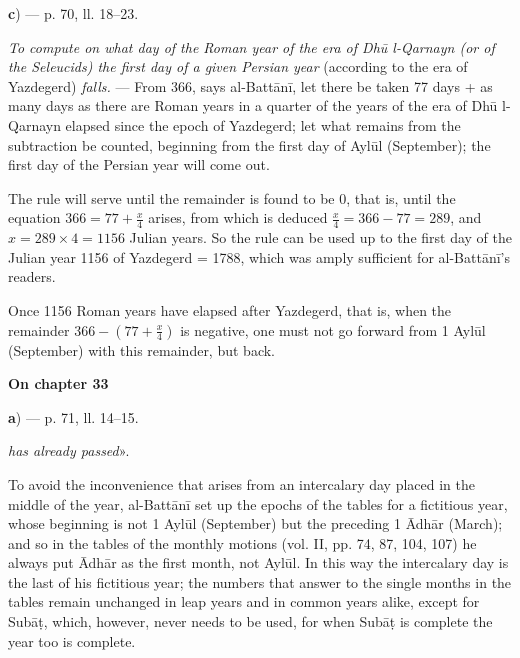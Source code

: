 \documentclass[11pt]{article}
\newcommand{\Pg}[1]{\marginpar{\footnotesize\color{gray}#1}}
\newcommand{\UnitHead}[2]{\par\setcounter{footnoteT}{0}\needspace{8\baselineskip}\bigskip\pdfbookmark[1]{#1}{unit-#2}\hypertarget{EN-#2}{}%
 {\large\bfseries\interlinepenalty=10000 #1\par}\nobreak\medskip}
\begin{document}
\par\begin{center}\textbf{c}) — p. 70, ll. 18–23.\end{center}
\par \emph{To compute on what day of the Roman year of the era of Dhū l-Qarnayn (or of the Seleucids) the first day of a given Persian year} (according to the era of Yazdegerd) \emph{falls.} — From 366, says al-Battānī, let there be taken 77 days + as many days as there are Roman years in a quarter of the years of the era of Dhū l-Qarnayn elapsed since the epoch of Yazdegerd; let what remains from the subtraction be counted, beginning from the first day of Aylūl (September); the first day of the Persian year will come out.\par
\par \Pg{I 246}The rule will serve until the remainder is found to be 0, that is, until the equation $366 = 77 + \frac{x}{4}$ arises, from which is deduced $\frac{x}{4} = 366 - 77 = 289$, and $x = 289 \times 4 = 1156$ Julian years. So the rule can be used up to the first day of the Julian year 1156 of Yazdegerd = 1788, which was amply sufficient for al-Battānī's readers.\par
\par Once 1156 Roman years have elapsed after Yazdegerd, that is, when the remainder $366 - \left(77 + \frac{x}{4}\right)$ is negative, one must not go forward from 1 Aylūl (September) with this remainder, but back.\par
\UnitHead{On chapter 33}{A33}
\par\begin{center}\textbf{a}) — p. 71, ll. 14–15.\end{center}
\par [«\emph{But do not count with them the year in which you are, unless the noon of the last day of Subāṭ} [February] \emph{has already passed}».\par
\par To avoid the inconvenience that arises from an intercalary day placed in the middle of the year, al-Battānī set up the epochs of the tables for a fictitious year, whose beginning is not 1 Aylūl (September) but the preceding 1 Ādhār (March); and so in the tables of the monthly motions (vol. II, pp. 74, 87, 104, 107) he always put Ādhār as the first month, not Aylūl. In this way the intercalary day is the last of his fictitious year; the numbers that answer to the single months in the tables remain unchanged in leap years and in common years alike, except for Subāṭ, which, however, never needs to be used, for when Subāṭ is complete the year too is complete.\par
\end{document}
